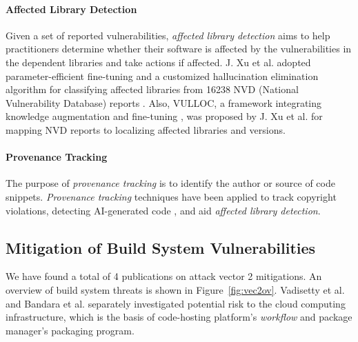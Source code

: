 \paragraph*{Affected Library Detection}
Given a set of reported vulnerabilities, \textit{affected library detection}
aims to help practitioners determine whether their software is affected by
the vulnerabilities in the dependent libraries and take actions if affected. 
J. Xu et al. adopted
parameter-efficient fine-tuning \citep{hu2022lora} and a customized
hallucination elimination algorithm for classifying affected libraries from
16238 NVD (National Vulnerability Database) reports \citep{10.1007/s10515-025-00540-6}.
Also, VULLOC, a framework integrating knowledge augmentation 
and fine-tuning \citep{11495563},  was proposed by  J. Xu et al.  for mapping
NVD reports to localizing affected libraries and versions.

\paragraph*{Provenance Tracking}
The purpose of \textit{provenance tracking} is to identify the author
or source of code snippets. \textit{Provenance tracking} techniques
have been applied to track copyright violations, detecting
AI-generated code \citep{10.1145/3605770.3625215}, and
aid \textit{affected library detection}.

\subsection{Mitigation of Build System Vulnerabilities}\label{subsec:vec2}
We have found a total of 4 publications on attack vector 2 mitigations.
An overview of build system threats is shown in Figure~\ref{fig:vec2ov}.
Vadisetty et al.\citep{11158656} and Bandara et al.\citep{10631014} 
separately investigated potential risk to the cloud computing infrastructure,
which is the basis of code-hosting platform's \textit{workflow} and
package manager's packaging program.

